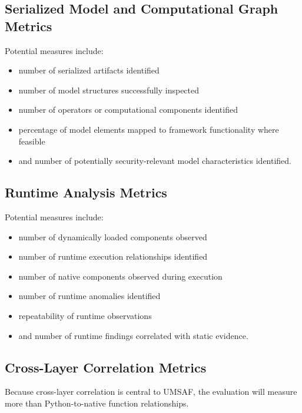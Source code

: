 \documentclass[
  12pt,
  letterpaper,
  oneside]{report}
\providecommand{\tightlist}{%
  \setlength{\itemsep}{0pt}\setlength{\parskip}{0pt}}
\begin{document}
\subsection{Serialized Model and Computational Graph Metrics}\label{1154-serialized-model-and-computational-graph-metrics}

Potential measures include:

\begin{itemize}
\tightlist
\item
  number of serialized artifacts identified
\item
  number of model structures successfully inspected
\item
  number of operators or computational components identified
\item
  percentage of model elements mapped to framework functionality where
  feasible
\item
  and number of potentially security-relevant model characteristics
  identified.
\end{itemize}

\subsection{Runtime Analysis Metrics}\label{1155-runtime-analysis-metrics}

Potential measures include:

\begin{itemize}
\tightlist
\item
  number of dynamically loaded components observed
\item
  number of runtime execution relationships identified
\item
  number of native components observed during execution
\item
  number of runtime anomalies identified
\item
  repeatability of runtime observations
\item
  and number of runtime findings correlated with static evidence.
\end{itemize}

\subsection{Cross-Layer Correlation Metrics}\label{1156-cross-layer-correlation-metrics}

Because cross-layer correlation is central to UMSAF, the evaluation will
measure more than Python-to-native function relationships.
\end{document}
